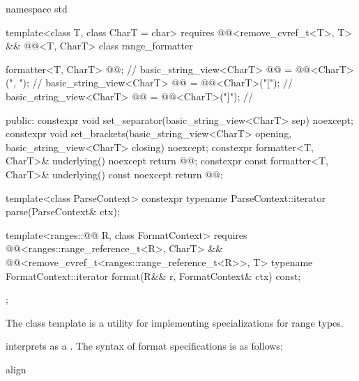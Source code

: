 %
\begin{codeblock}
namespace std {
  template<class T, class CharT = char>
    requires @@<remove_cvref_t<T>, T> && @@<T, CharT>
  class range_formatter {
    formatter<T, CharT> @@;                                          // \expos
    basic_string_view<CharT> @@ = @@<CharT>(", ");      // \expos
    basic_string_view<CharT> @@ = @@<CharT>("["); // \expos
    basic_string_view<CharT> @@ = @@<CharT>("]"); // \expos

  public:
    constexpr void set_separator(basic_string_view<CharT> sep) noexcept;
    constexpr void set_brackets(basic_string_view<CharT> opening,
                                basic_string_view<CharT> closing) noexcept;
    constexpr formatter<T, CharT>& underlying() noexcept { return @@; }
    constexpr const formatter<T, CharT>& underlying() const noexcept { return @@; }

    template<class ParseContext>
      constexpr typename ParseContext::iterator
        parse(ParseContext& ctx);

    template<ranges::@@ R, class FormatContext>
        requires @@<ranges::range_reference_t<R>, CharT> &&
                 @@<remove_cvref_t<ranges::range_reference_t<R>>, T>
      typename FormatContext::iterator
        format(R&& r, FormatContext& ctx) const;
  };
}
\end{codeblock}

\pnum
The class template  is a utility
for implementing  specializations for range types.

\pnum
{} interprets 
as a .
The syntax of format specifications is as follows:

\begin{ncbnf}
\br
        
\end{ncbnf}

\begin{ncbnf}
\br
     align
\end{ncbnf}

